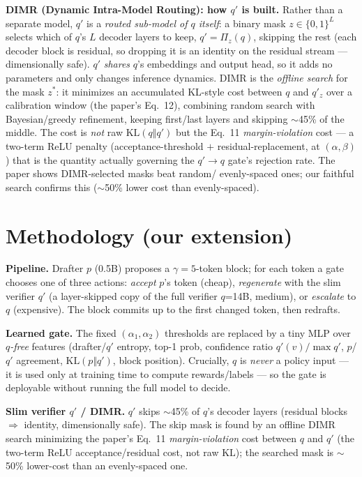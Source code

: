 \documentclass[11pt]{article}
\begin{document}
\textbf{DIMR (Dynamic Intra-Model Routing): how $q'$ is built.} Rather than a separate model, $q'$ is
a \emph{routed sub-model of $q$ itself}: a binary mask $z\in\{0,1\}^L$ selects which of $q$'s $L$
decoder layers to keep, $q'=\Pi_z(q)$, skipping the rest (each decoder block is residual, so dropping
it is an identity on the residual stream --- dimensionally safe). $q'$ \emph{shares} $q$'s embeddings
and output head, so it adds no parameters and only changes inference dynamics. DIMR is the
\emph{offline search} for the mask $z^*$: it minimizes an accumulated KL-style cost between $q$ and
$q'_z$ over a calibration window (the paper's Eq.~12), combining random search with Bayesian/greedy
refinement, keeping first/last layers and skipping $\sim$45\% of the middle. The cost is \emph{not}
raw $\mathrm{KL}(q\Vert q')$ but the Eq.~11 \emph{margin-violation} cost --- a two-term ReLU penalty
(acceptance-threshold $+$ residual-replacement, at $(\alpha,\beta)$) that is the quantity actually
governing the $q'\!\to\!q$ gate's rejection rate. The paper shows DIMR-selected masks beat random/
evenly-spaced ones; our faithful search confirms this ($\sim$50\% lower cost than evenly-spaced).

\section{Methodology (our extension)}
\textbf{Pipeline.} Drafter $p$ (0.5B) proposes a $\gamma{=}5$-token block; for each token a gate
chooses one of three actions: \emph{accept} $p$'s token (cheap), \emph{regenerate} with the
slim verifier $q'$ (a layer-skipped copy of the full verifier $q$=14B, medium), or
\emph{escalate} to $q$ (expensive). The block commits up to the first changed token, then redrafts.

\textbf{Learned gate.} The fixed $(\alpha_1,\alpha_2)$ thresholds are replaced by a tiny MLP over
\emph{$q$-free} features (drafter/$q'$ entropy, top-1 prob, confidence ratio $q'(v)/\max q'$,
$p$/$q'$ agreement, $\mathrm{KL}(p\Vert q')$, block position). Crucially, $q$ is \emph{never} a
policy input --- it is used only at training time to compute rewards/labels --- so the gate is
deployable without running the full model to decide.

\textbf{Slim verifier $q'$ / DIMR.} $q'$ skips $\sim$45\% of $q$'s decoder layers (residual blocks
$\Rightarrow$ identity, dimensionally safe). The skip mask is found by an offline DIMR search
minimizing the paper's Eq.~11 \emph{margin-violation} cost between $q$ and $q'$ (the two-term
ReLU acceptance/residual cost, not raw $\mathrm{KL}$); the searched mask is $\sim$50\% lower-cost
than an evenly-spaced one.
\end{document}
